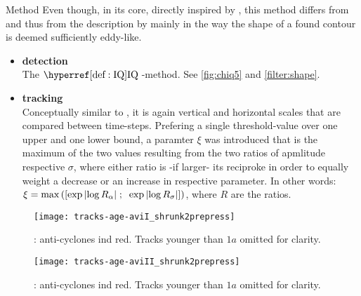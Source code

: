 \begin{cbox}{Method \MII}\label{box:MII}
Even though, in its core, directly inspired by \citet{Chelton2011}, this method differs from \MII and thus from the description by \citeauthor{Chelton2011} mainly in the way the shape of a found contour is deemed sufficiently eddy-like.
\begin{itemize}
	\item \textbf{detection}\\
	 The $\IQ$-method. See \ref{fig:chiq5} and \ref{filter:shape}.
	\item \textbf{tracking}\\
	Conceptually similar to \MI, it is again vertical and horizontal scales that are compared between time-steps. Prefering a single threshold-value over one upper and one lower bound, a paramter $\xi$ was introduced that is the maximum of the two values resulting from the two ratios of apmlitude respective $\sigma$, where either ratio is -if larger- its reciproke in order to equally weight a decrease or an increase in respective parameter. In other words:
$\xi = \max{\left(\left[\exp{\left|\log{R_{\alpha}}\right|}\; ; \;\; \exp{\left|\log{R_{\sigma}}\right|} \right]\right)} $, where $R$ are the ratios.
\end{itemize}
\end{cbox}

\begin{figure}
	\texttt{[image: tracks-age-aviI\_shrunk2prepress]}
	\caption{\MI: anti-cyclones ind red. Tracks younger than $1a$ omitted for clarity.}
	\label{fig:tracks-age-aviI_shrunk2prepress}
\end{figure}

\begin{figure}
	\texttt{[image: tracks-age-aviII\_shrunk2prepress]}
	\caption{\MII: anti-cyclones ind red. Tracks younger than $1a$ omitted for clarity.}
	\label{fig:tracks-age-aviII_shrunk2prepress}
\end{figure}
